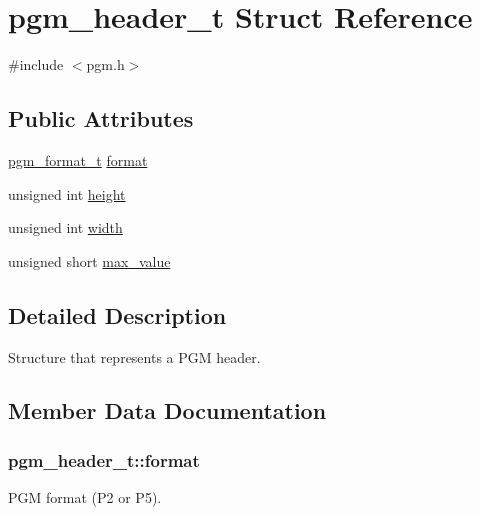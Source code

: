 \hypertarget{structpgm__header__t}{}\section{pgm\+\_\+header\+\_\+t Struct Reference}
\label{structpgm__header__t}


{\ttfamily \#include $<$pgm.\+h$>$}

\subsection*{Public Attributes}
\begin{DoxyCompactItemize}
\item 
\hyperlink{pgm_8h_a8c5948362728072def386a942eba8cc2}{pgm\+\_\+format\+\_\+t} \hyperlink{structpgm__header__t_af7e1de2a2db85b9a3a3de25e25f16ca9}{format}
\item 
unsigned int \hyperlink{structpgm__header__t_ab5277a5040e388eb35e9e99c3c986b93}{height}
\item 
unsigned int \hyperlink{structpgm__header__t_a3b5d619d3a7a2ace9dd3c3f4f5ab7204}{width}
\item 
unsigned short \hyperlink{structpgm__header__t_adbfbe5c1f5a224b0709248e4f8f4441a}{max\+\_\+value}
\end{DoxyCompactItemize}


\subsection{Detailed Description}
Structure that represents a P\+G\+M header. 

\subsection{Member Data Documentation}
\hypertarget{structpgm__header__t_af7e1de2a2db85b9a3a3de25e25f16ca9}{}
\subsubsection[{format}]{ pgm\+\_\+header\+\_\+t\+::format}\label{structpgm__header__t_af7e1de2a2db85b9a3a3de25e25f16ca9}
P\+G\+M format (P2 or P5). \hypertarget{structpgm__header__t_ab5277a5040e388eb35e9e99c3c986b93}{}
